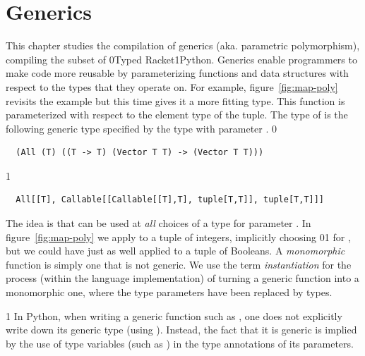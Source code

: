 \documentclass[7x10]{TimesAPriori_MIT}%
\def\racketEd{0}
\def\pythonEd{1}
\def\edition{0}
\newcommand{\racket}[1]{{\if\edition\racketEd{#1}\fi}}
\newcommand{\python}[1]{{\if\edition\pythonEd #1\fi}}
\numberwithin{theorem}{chapter}
\numberwithin{definition}{chapter}
\numberwithin{equation}{chapter}
\begin{document}

\chapter{Generics}
\label{ch:Lpoly}
\setcounter{footnote}{0}

This chapter studies the compilation of
generics (aka. parametric
polymorphism), compiling the
\LangPoly{} subset of \racket{Typed Racket}\python{Python}.  Generics
enable programmers to make code more reusable by parameterizing
functions and data structures with respect to the types that they
operate on. For example, figure~\ref{fig:map-poly} revisits the
 example but this time gives it a more fitting type.  This
 function is parameterized with respect to the element type
of the tuple. The type of  is the following generic type
specified by the  type with parameter .
\if\edition\racketEd
\begin{lstlisting}
  (All (T) ((T -> T) (Vector T T) -> (Vector T T)))
\end{lstlisting}
\fi
\if\edition\pythonEd
\begin{lstlisting}
  All[[T], Callable[[Callable[[T],T], tuple[T,T]], tuple[T,T]]]
\end{lstlisting}
\fi
%
The idea is that  can be used at \emph{all} choices of a
type for parameter . In figure~\ref{fig:map-poly} we apply
 to a tuple of integers, implicitly choosing
\racket{}\python{} for , but we could
have just as well applied  to a tuple of Booleans.
%
A \emph{monomorphic} function is simply one that is not generic.
%
We use the term \emph{instantiation} for the process (within the
language implementation) of turning a generic function into a
monomorphic one, where the type parameters have been replaced by
types.

\if\edition\pythonEd
%
In Python, when writing a generic function such as , one
does not explicitly write down its generic type (using ).
Instead, the fact that it is generic is implied by the use of type
variables (such as ) in the type annotations of its
parameters.
%
\fi
\end{document}
